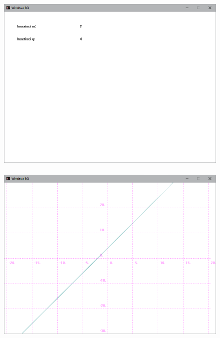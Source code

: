 \documentclass[12pt]{book}
\begin{document}
				\begin{figure}[h]
					\includegraphics[scale=0.5]{tracciarettaterminale1}
						\\ \\
					\includegraphics[scale=0.5]{tracciarettaterminale2}
				\end{figure}
		\clearpage
			\newpage
		\clearpage
\end{document}
